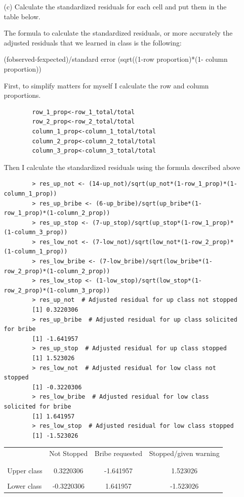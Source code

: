 \documentclass[12pt,letterpaper]{article}
\begin{document}
\begin{enumerate}
	\newpage
	\item [(c)] Calculate the standardized residuals for each cell and put them in the table below.
	
	The formula to calculate the standardized residuals, or more accurately the adjusted residuals that we learned in class is the following:
	
	(fobserved-fexpected)/standard error (sqrt((1-row proportion)*(1- column proportion))
	
	First, to simplify matters for myself I calculate the row and column proportions.
	\begin{verbatim}	
		row_1_prop<-row_1_total/total
		row_2_prop<-row_2_total/total
		column_1_prop<-column_1_total/total
		column_2_prop<-column_2_total/total
		column_3_prop<-column_3_total/total
	\end{verbatim}
	
	Then I calculate the standardized residuals using the formula described above
	\begin{verbatim}	
		> res_up_not <- (14-up_not)/sqrt(up_not*(1-row_1_prop)*(1-column_1_prop))
		> res_up_bribe <- (6-up_bribe)/sqrt(up_bribe*(1-row_1_prop)*(1-column_2_prop))
		> res_up_stop <- (7-up_stop)/sqrt(up_stop*(1-row_1_prop)*(1-column_3_prop))
		> res_low_not <- (7-low_not)/sqrt(low_not*(1-row_2_prop)*(1-column_1_prop))
		> res_low_bribe <- (7-low_bribe)/sqrt(low_bribe*(1-row_2_prop)*(1-column_2_prop))
		> res_low_stop <- (1-low_stop)/sqrt(low_stop*(1-row_2_prop)*(1-column_3_prop))
		> res_up_not  # Adjusted residual for up class not stopped
		[1] 0.3220306
		> res_up_bribe  # Adjusted residual for up class solicited for bribe
		[1] -1.641957
		> res_up_stop  # Adjusted residual for up class stopped
		[1] 1.523026
		> res_low_not  # Adjusted residual for low class not stopped
		[1] -0.3220306
		> res_low_bribe  # Adjusted residual for low class solicited for bribe
		[1] 1.641957
		> res_low_stop  # Adjusted residual for low class stopped
		[1] -1.523026
	\end{verbatim}
	
	
	\begin{table}[h]
		\centering
		\begin{tabular}{l | c c c }
			& Not Stopped & Bribe requested & Stopped/given warning \\
			\\[-1.8ex] 
			\hline \\[-1.8ex]
			Upper class  &0.3220306  & -1.641957 &1.523026  \\
			\\
			Lower class &-0.3220306  &1.641957   &-1.523026   \\
			

\end{tabular}
\end{table}
\end{enumerate}
\end{document}
